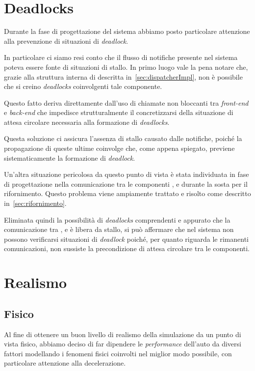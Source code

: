 \section{Deadlocks}
Durante la fase di progettazione del sistema abbiamo posto particolare attenzione alla prevenzione di situazioni di \textit{deadlock}.

In particolare ci siamo resi conto che il flusso di notifiche presente nel sistema poteva essere fonte di situazioni di stallo.
In primo luogo vale la pena notare che, grazie alla struttura interna di \evdisp{} descritta in~\ref{sec:dispatcherImpl}, non è possibile che si creino \textit{deadlocks} coinvolgenti tale componente.

Questo fatto deriva direttamente dall'uso di chiamate non bloccanti tra \textit{front-end} e \textit{back-end} che impedisce strutturalmente il concretizzarsi della situazione di attesa circolare necessaria alla formazione di \textit{deadlocks}.

Questa soluzione ci assicura l'assenza di stallo causato dalle notifiche, poiché la propagazione di queste ultime coinvolge \evdisp{} che, come appena spiegato, previene sistematicamente la formazione di \textit{deadlock}.

Un'altra situazione pericolosa da questo punto di vista è stata individuata in fase di progettazione nella comunicazione tra le componenti \track{}, \team{} e \car{} durante la sosta per il rifornimento. Questo problema viene ampiamente trattato e risolto come descritto in~\ref{sec:rifornimento}.

Eliminata quindi la possibilità di \textit{deadlocks} comprendenti \evdisp{} e appurato che la comunicazione tra \track{}, \team{} e \car{} è libera da stallo, si può affermare che nel sistema non possono verificarsi situazioni di \textit{deadlock} poiché, per quanto riguarda le rimanenti comunicazioni, non sussiste la precondizione di attesa circolare tra le componenti.
\section{Realismo}
\subsection*{Fisico}
Al fine di ottenere un buon livello di realismo della simulazione da un punto di vista fisico, abbiamo deciso di far dipendere le \textit{performance} dell'auto da diversi fattori modellando i fenomeni fisici coinvolti nel miglior modo possibile, con particolare attenzione alla decelerazione.

